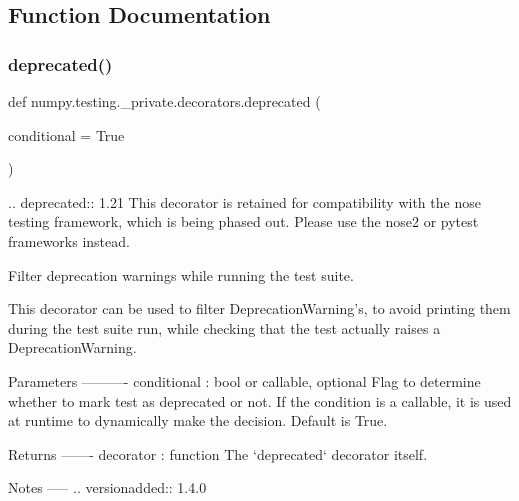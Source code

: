 \subsection{Function Documentation}
\mbox{\label{namespacenumpy_1_1testing_1_1__private_1_1decorators_a8c284617f70345ce6ded679abb07aaa9}} 
\subsubsection{\texorpdfstring{deprecated()}{deprecated()}}
{\footnotesize\ttfamily def numpy.\+testing.\+\_\+private.\+decorators.\+deprecated (\begin{DoxyParamCaption}\item[{}]{conditional = {\ttfamily True} }\end{DoxyParamCaption})}

\begin{DoxyVerb}.. deprecated:: 1.21
    This decorator is retained for compatibility with the nose testing framework, which is being phased out.
    Please use the nose2 or pytest frameworks instead.

Filter deprecation warnings while running the test suite.

This decorator can be used to filter DeprecationWarning's, to avoid
printing them during the test suite run, while checking that the test
actually raises a DeprecationWarning.

Parameters
----------
conditional : bool or callable, optional
    Flag to determine whether to mark test as deprecated or not. If the
    condition is a callable, it is used at runtime to dynamically make the
    decision. Default is True.

Returns
-------
decorator : function
    The `deprecated` decorator itself.

Notes
-----
.. versionadded:: 1.4.0\end{DoxyVerb}
 \mbox{\label{namespacenumpy_1_1testing_1_1__private_1_1decorators_aad1876fbbd179bf5da34024026d008f6}} 
